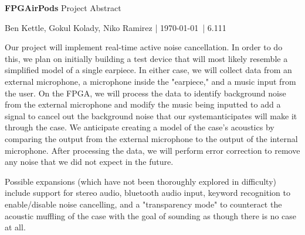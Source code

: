 \documentclass[12pt]{article}
\begin{document}
{\Huge \sffamily \textbf{FPGAirPods} Project Abstract}

\vspace{2mm}
{\sffamily Ben Kettle, Gokul Kolady, Niko Ramirez | \today \ | 6.111}
\vspace{5mm}

Our project will implement real-time active noise cancellation. In order to do this, we plan on initially building a test device that will most likely resemble a simplified model of a single earpiece. In either case, we will collect data from an external microphone, a microphone inside the "earpiece," and a music input from the user. On the FPGA, we will process the data to identify background noise from the external microphone and modify the music being inputted to add a signal to cancel out the background noise that our systemanticipates will make it through the case. We anticipate creating a model of the case's acoustics by comparing the output from the external microphone to the output of the internal microphone. After processing the data, we will perform error correction to remove any noise that we did not expect in the future.  

Possible expansions (which have not been thoroughly explored in difficulty) include support for stereo audio, bluetooth audio input, keyword recognition to enable/disable noise cancelling, and a "transparency mode" to counteract the acoustic muffling of the case with the goal of sounding as though there is no case at all.
\end{document}

